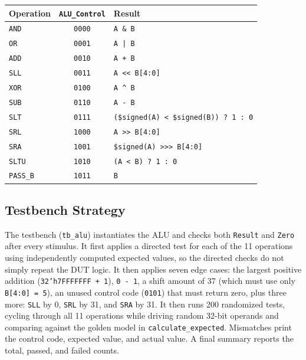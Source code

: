 \documentclass[11pt, a4paper]{article}
\begin{document}
\begin{center}
\small
\begin{tabular}{@{}l c l@{}}
\toprule
\textbf{Operation} & \textbf{\texttt{ALU\_Control}} & \textbf{Result} \\
\midrule
\texttt{AND}    & \texttt{0000} & \texttt{A \& B} \\
\texttt{OR}     & \texttt{0001} & \texttt{A | B} \\
\texttt{ADD}    & \texttt{0010} & \texttt{A + B} \\
\texttt{SLL}    & \texttt{0011} & \texttt{A << B[4:0]} \\
\texttt{XOR}    & \texttt{0100} & \texttt{A \^{} B} \\
\texttt{SUB}    & \texttt{0110} & \texttt{A - B} \\
\texttt{SLT}    & \texttt{0111} & \texttt{(\$signed(A) < \$signed(B)) ? 1 : 0} \\
\texttt{SRL}    & \texttt{1000} & \texttt{A >> B[4:0]} \\
\texttt{SRA}    & \texttt{1001} & \texttt{\$signed(A) >>> B[4:0]} \\
\texttt{SLTU}   & \texttt{1010} & \texttt{(A < B) ? 1 : 0} \\
\texttt{PASS\_B}& \texttt{1011} & \texttt{B} \\
\bottomrule
\end{tabular}
\end{center}

\subsection*{Testbench Strategy}
The testbench (\texttt{tb\_alu}) instantiates the ALU and checks both \texttt{Result} and \texttt{Zero} after every stimulus. It first applies a directed test for each of the 11 operations using independently computed expected values, so the directed checks do not simply repeat the DUT logic. It then applies seven edge cases: the largest positive addition (\texttt{32'h7FFFFFFF + 1}), \texttt{0 - 1}, a shift amount of 37 (which must use only \texttt{B[4:0] = 5}), an unused control code (\texttt{0101}) that must return zero, plus three more: \texttt{SLL} by 0, \texttt{SRL} by 31, and \texttt{SRA} by 31. It then runs 200 randomized tests, cycling through all 11 operations while driving random 32-bit operands and comparing against the golden model in \texttt{calculate\_expected}. Mismatches print the control code, expected value, and actual value. A final summary reports the total, passed, and failed counts.
\end{document}
